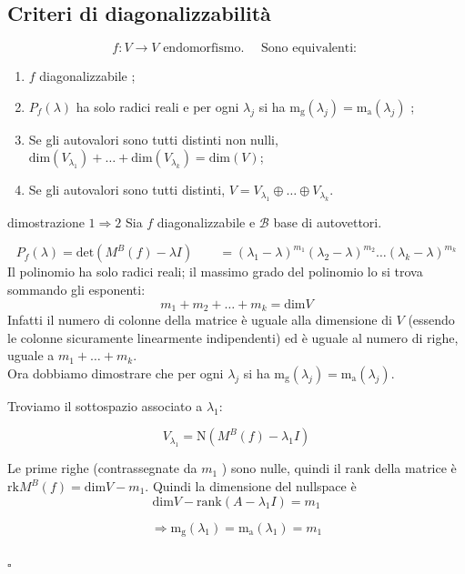 \documentclass[x11names]{article}
\newcommand*{\QEDB}{\null\nobreak\hfill\ensuremath{\square}}%
\begin{document}
\subsection{Criteri di diagonalizzabilità}
 \[
f: V \longrightarrow V \text{ endomorfismo.} \quad \text{ Sono equivalenti: }
\] 
\begin{enumerate}
	\item $f$ diagonalizzabile ;
	\item $P_{f}\left(\lambda\right)$ ha solo radici reali e per ogni $\lambda_{j}$ si ha $\text{m}_{\text{g}}\left(\lambda_{j}\right) = \text{m}_{\text{a}}\left(\lambda_{j}\right)$ ;
	\item Se gli autovalori sono tutti distinti non nulli, $\text{dim}\left(V_{\lambda_{1}}\right) + \dots + \text{dim}\left(V_{\lambda_{k}}\right) = \text{dim}\left(V\right)$;
	\item Se gli autovalori sono tutti distinti, $V = V_{\lambda_{1}} \oplus \dots \oplus V_{\lambda_{k}}$.
\end{enumerate}

\begin{es}{dimostrazione $1 \Rightarrow 2$}
Sia  $f$ diagonalizzabile e  $\mathscr{B}$ base di autovettori.
\begin{center}

\end{center}

\[
P_{f}\left(\lambda\right) = \text{det}\left(M^{B}\left(f\right)-\lambda I\right) \qquad = \left(\lambda_1 - \lambda\right)^{m_1}\left(\lambda_2 - \lambda\right)^{m_2} \dots \left(\lambda_{k} - \lambda\right)^{m_{k}}
\] 
Il polinomio ha solo radici reali; il massimo grado del polinomio lo si trova sommando gli esponenti:
\[
m_1 + m_2 + \dots + m_{k} = \text{dim}V
\]
Infatti il numero di colonne della matrice è uguale alla dimensione di $V$ (essendo le colonne sicuramente linearmente indipendenti) ed è uguale al numero di righe, uguale a $m_1 + \dots + m_{k}$. \\ 

Ora dobbiamo dimostrare che per ogni $\lambda_{j}$ si ha $\text{m}_{\text{g}}\left(\lambda_{j}\right) = \text{m}_{\text{a}}\left(\lambda_{j}\right)$.

Troviamo il sottospazio associato a $\lambda_1$:

\[
V_{\lambda_{1}} = \text{N}\left(M^B\left(f\right) - \lambda_1 I\right)
\] 

\begin{center}

\end{center}

Le prime righe (contrassegnate da $m_1$ ) sono nulle, quindi il rank della matrice è $\text{rk}M^B\left(f\right) = \text{dim}V - m_1$.  Quindi la dimensione del nullspace è
\[
\text{dim}V - \text{rank}\left(A-\lambda_1 I\right) = m_1
\] 

\[
\Longrightarrow \text{m}_{\text{g}}\left(\lambda_{1}\right) = \text{m}_{\text{a}}\left(\lambda_{1}\right) = m_1
\] 
\\
\QEDB
\end{es}
\end{document}
